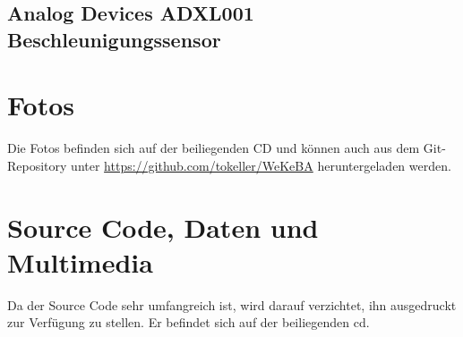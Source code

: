 

\subsection{Analog Devices ADXL001 Beschleunigungssensor}



\section{Fotos}\label{sec.foto.testaufbau}
Die Fotos befinden sich auf der beiliegenden CD und können auch aus dem Git-Repository unter \url{https://github.com/tokeller/WeKeBA} heruntergeladen werden.

\section{Source Code, Daten und Multimedia}\label{app.cd}
Da der Source Code sehr umfangreich ist, wird darauf verzichtet, ihn ausgedruckt zur Verfügung zu stellen. Er befindet sich auf der beiliegenden \gls{cd}.

